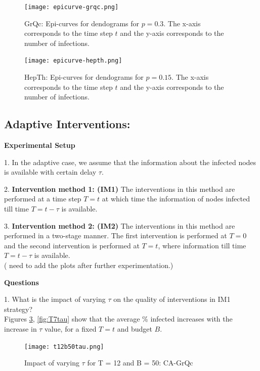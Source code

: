 \begin{figure}[!h]
    \centering
    \texttt{[image: epicurve-grqc.png]}
    \caption{GrQc: Epi-curves for dendograms for $p=0.3$. The x-axis corresponds to the time step $t$ and the y-axis corresponds to the number of infections.}
    \label{fig:epicurveGrQc}
\end{figure}

\begin{figure}[!h]
    \centering
    \texttt{[image: epicurve-hepth.png]}
    \caption{HepTh: Epi-curves for dendograms for $p =0.15$. The x-axis corresponds to the time step $t$ and the y-axis corresponds to the number of infections.}
    \label{fig:epicurveHepTh}
\end{figure}

%
%


\newpage
\subsection{Adaptive Interventions:}

\textbf{Experimental Setup}

1. In the adaptive case, we assume that the information about the infected nodes is available with certain delay $\tau$. 

2. \textbf{Intervention method 1: (IM1)} The interventions in this method are performed at a time step $T = t$ at which time the information of nodes infected till time $T = t-\tau$ is available. 

3. \textbf{Intervention method 2: (IM2)} The interventions in this method are performed in a two-stage manner. 
The first intervention is performed at $T = 0$ and the second intervention is performed at $T = t$, where information till time $T = t- \tau $ is available.\\ ( need to add the plots after further experimentation.)

\noindent
\textbf{Questions}

1. What is the impact of varying $\tau$ on the quality of interventions in IM1 strategy? \\

Figures \ref{fig:T12tau}, \ref{fig:T7tau} show that the average \% infected increases with the increase in $\tau$ value, for a fixed $T = t$ and budget $B$.
\begin{figure}[!h]
    \centering
    \texttt{[image: t12b50tau.png]}
    \caption{Impact of varying $\tau$ for T = 12 and B = 50: CA-GrQc}
    \label{fig:T12tau}
\end{figure}

